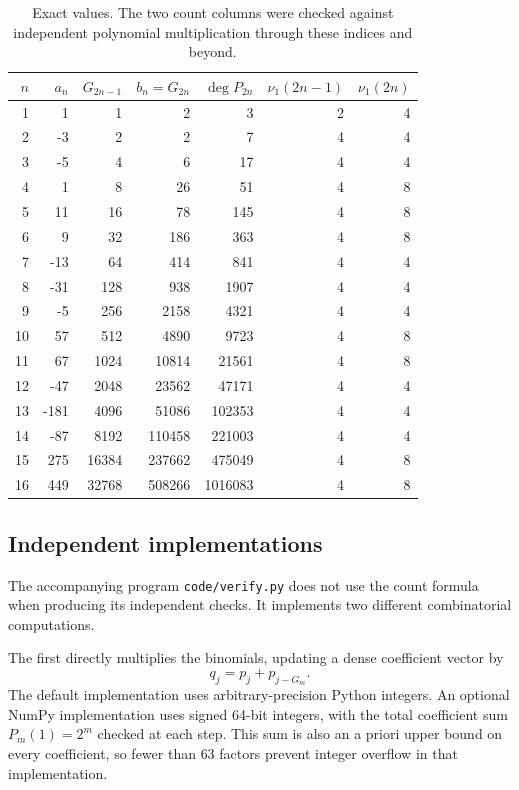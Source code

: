 \documentclass[11pt]{article}
\theoremstyle{definition}\newtheorem{definition}[theorem]{Definition}
\theoremstyle{remark}\newtheorem{remark}[theorem]{Remark}
\newcommand{\nuone}{\nu_1}
\begin{document}
\begin{table}[htbp]
\centering\small
\setlength{\tabcolsep}{7pt}
\begin{tabular}{rrrrrrr}
\toprule
$n$&$a_n$&$G_{2n-1}$&$b_n=G_{2n}$&$\deg P_{2n}$&$\nuone(2n-1)$&$\nuone(2n)$\\
\midrule
1 & 1 & 1 & 2 & 3 & 2 & 4 \\
2 & -3 & 2 & 2 & 7 & 4 & 4 \\
3 & -5 & 4 & 6 & 17 & 4 & 4 \\
4 & 1 & 8 & 26 & 51 & 4 & 8 \\
5 & 11 & 16 & 78 & 145 & 4 & 8 \\
6 & 9 & 32 & 186 & 363 & 4 & 8 \\
7 & -13 & 64 & 414 & 841 & 4 & 4 \\
8 & -31 & 128 & 938 & 1907 & 4 & 4 \\
9 & -5 & 256 & 2158 & 4321 & 4 & 4 \\
10 & 57 & 512 & 4890 & 9723 & 4 & 8 \\
11 & 67 & 1024 & 10814 & 21561 & 4 & 8 \\
12 & -47 & 2048 & 23562 & 47171 & 4 & 4 \\
13 & -181 & 4096 & 51086 & 102353 & 4 & 4 \\
14 & -87 & 8192 & 110458 & 221003 & 4 & 4 \\
15 & 275 & 16384 & 237662 & 475049 & 4 & 8 \\
16 & 449 & 32768 & 508266 & 1016083 & 4 & 8 \\
\bottomrule
\end{tabular}
\caption{Exact values. The two count columns were checked against independent polynomial multiplication through these indices and beyond.}\label{tab:blocks}
\end{table}

\subsection{Independent implementations}

The accompanying program \texttt{code/verify.py} does not use the count formula when producing its independent checks. It implements two different combinatorial computations.

The first directly multiplies the binomials, updating a dense coefficient vector by
\[
 q_j=p_j+p_{j-G_m}.
\]
The default implementation uses arbitrary-precision Python integers. An optional NumPy implementation uses signed 64-bit integers, with the total coefficient sum $P_m(1)=2^m$ checked at each step. This sum is also an a priori upper bound on every coefficient, so fewer than $63$ factors prevent integer overflow in that implementation.
\end{document}
